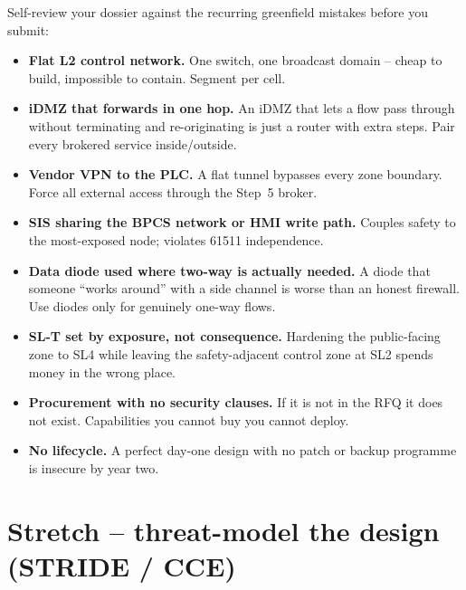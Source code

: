 \documentclass[11pt,a4paper]{article}
\begin{document}
\begin{notebox}
Self-review your dossier against the recurring greenfield mistakes
before you submit:
\begin{itemize}\setlength{\itemsep}{1pt}
  \item \textbf{Flat L2 control network.} One switch, one broadcast
    domain -- cheap to build, impossible to contain. Segment per cell.
  \item \textbf{iDMZ that forwards in one hop.} An iDMZ that lets a flow
    pass through without terminating and re-originating is just a router
    with extra steps. Pair every brokered service inside/outside.
  \item \textbf{Vendor VPN to the PLC.} A flat tunnel bypasses every zone
    boundary. Force all external access through the Step~5 broker.
  \item \textbf{SIS sharing the BPCS network or HMI write path.} Couples
    safety to the most-exposed node; violates 61511 independence.
  \item \textbf{Data diode used where two-way is actually needed.} A diode
    that someone ``works around'' with a side channel is worse than an
    honest firewall. Use diodes only for genuinely one-way flows.
  \item \textbf{SL-T set by exposure, not consequence.} Hardening the
    public-facing zone to SL4 while leaving the safety-adjacent control
    zone at SL2 spends money in the wrong place.
  \item \textbf{Procurement with no security clauses.} If it is not in the
    RFQ it does not exist. Capabilities you cannot buy you cannot deploy.
  \item \textbf{No lifecycle.} A perfect day-one design with no patch or
    backup programme is insecure by year two.
\end{itemize}
\end{notebox}

\section*{Stretch -- threat-model the design (STRIDE / CCE)}
\end{document}
